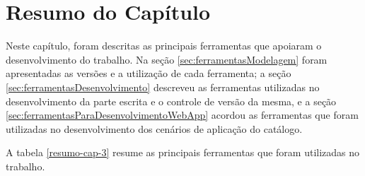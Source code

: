 \section*{Resumo do Capítulo}

Neste capítulo, foram descritas as principais ferramentas que apoiaram o desenvolvimento do trabalho. Na seção \ref{sec:ferramentasModelagem} foram apresentadas as versões e a utilização de cada ferramenta; a seção \ref{sec:ferramentasDesenvolvimento} descreveu as ferramentas utilizadas no desenvolvimento da parte escrita e o controle de versão da mesma, e a seção \ref{sec:ferramentasParaDesenvolvimentoWebApp} acordou as ferramentas que foram utilizadas no desenvolvimento dos cenários de aplicação do catálogo. 


A tabela \ref{resumo-cap-3} resume as principais ferramentas que foram utilizadas no trabalho.

